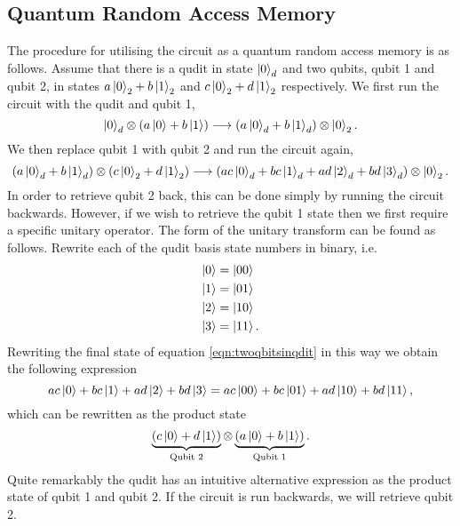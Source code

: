 \subsection{Quantum Random Access Memory}
\label{subsection:qram}
The procedure for utilising the circuit as a quantum random access memory is as follows.
Assume that there is a qudit in state $\ket{0}_d$ and two qubits, qubit 1 and qubit 2, in states $a\ket{0}_2 + b\ket{1}_2$ and $c\ket{0}_2 + d\ket{1}_2$ respectively.
We first run the circuit with the qudit and qubit 1,
\begin{equation}
    \ket{0}_d \otimes \left(a\ket{0} + b\ket{1}\right) \longrightarrow \left(a\ket{0}_d + b\ket{1}_d\right) \otimes \ket{0}_2.
\end{equation}
We then replace qubit 1 with qubit 2 and run the circuit again,
\begin{equation}
    \left(a\ket{0}_d + b\ket{1}_d\right) \otimes \left(c\ket{0}_2 + d\ket{1}_2 \right) \longrightarrow \left(ac\ket{0}_d + bc\ket{1}_d + ad\ket{2}_d + bd\ket{3}_d \right)\otimes\ket{0}_2.
    \label{eqn:twoqbitsinqdit}
\end{equation}
In order to retrieve qubit 2 back, this can be done simply by running the circuit backwards.
However, if we wish to retrieve the qubit 1 state then we first require a specific unitary operator. The form of the unitary transform can be found as follows.
Rewrite each of the qudit basis state numbers in binary, i.e.
\begin{align}
    \ket{0} &= \ket{00}\\
    \ket{1} &= \ket{01}\\
    \ket{2} &= \ket{10}\\
    \ket{3} &= \ket{11}.
\end{align}
Rewriting the final state of equation \ref{eqn:twoqbitsinqdit} in this way we obtain the following expression
\begin{equation}
    ac\ket{0} + bc\ket{1} + ad\ket{2} + bd\ket{3} = ac\ket{00} + bc\ket{01} + ad\ket{10} + bd\ket{11},
    \label{eqn:binaryexpression}
\end{equation}
which can be rewritten as the product state
\begin{equation}
    \underbrace{\left(c\ket{0} + d\ket{1}\right)}_{\text{Qubit 2}} \otimes \underbrace{\left(a\ket{0} + b\ket{1}\right)}_{\text{Qubit 1}}.
\end{equation}
Quite remarkably the qudit has an intuitive alternative expression as the product state of qubit 1 and qubit 2.
If the circuit is run backwards, we will retrieve qubit 2.
